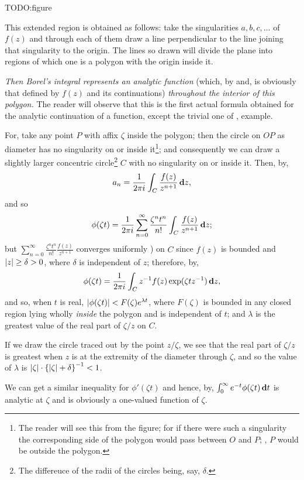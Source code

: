 TODO:figure

This extended region is obtained as follows: take the singularities
$a,b,c,\ldots$ of $f(z)$ and through each of them draw a line perpendicular
to the line joining that singularity to the origin. The lines so drawn
will divide the plane into regions of which one is a polygon with the
origin inside it.

\emph{Then Borel's integral represents an analytic function}
(which, by
and, is obviously that defined by $f(z)$
and its continuations)
\emph{throughout the interior of this polygon.} The reader will observe that
this is the first actual formula obtained for the analytic
continuation of a function, except the trivial one of
, example.

For, take any point $P$ with affix $\zeta$ inside the polygon; then
the circle on $OP$ as diameter has no singularity on or inside
it\footnote{The reader will see this from the figure; for if there were such a
singularity the corresponding side of the polygon would pass between
$O$ and $P$; \ie,
 $P$ would be outside the polygon.}; and
consequently we can draw a slightly
%
%
larger concentric circle\footnote{The differeuce of the radii of the
  circles being, say, $\delta$.} $C$ with no singularity on or inside
it. Then, by,
$$
a_{n}
=
\frac{1}{2 \pi i}
\int_{C} \frac{f(z)}{z^{n+1}} \, \mathbf{d} z,
$$
and so
$$
\phi(\zeta t)
=
\frac{1}{2 \pi i}
\sum_{n=0}^{\infty}
\frac{\zeta^{n} t^{n}}{n!}
\int_{C} \frac{f(z)}{z^{n+1}} \, \mathbf{d} z;
$$
but
$\sum_{n=0}^{\infty} \frac{\zeta^{n} t^{n}}{n!} \frac{f(z)}{z^{n+1}}$
converges uniformly ) on $C$ since
$f(z)$ is bounded and $\left| z \right| \geq \delta > 0$, where
$\delta$ is independent of $z$; therefore, by,
$$
\phi(\zeta t)
=
\frac{1}{2 \pi i}
\int_{C} z^{-1} f(z) \exp(\zeta t z^{-1}) \, \mathbf{d} z,
$$
and so, when $t$ is real,
$\left| \phi(\zeta t) \right| < F(\zeta) e^{\lambda t}$,
where $F(\zeta)$ is bounded in any closed region lying wholly
\emph{inside} the polygon and is independent of $t$;
and $\lambda$ is the greatest value of the real part of
$\zeta / z$ on $C$.

If we draw the circle traced out by the point $z/\zeta$, we see that
the real part of $\zeta/z$ is greatest when $z$ is at the extremity of the
diameter through $\zeta$, and so the value of $\lambda$ is
$ \left| \zeta \right| \cdot \left\{ \left| \zeta \right| + \delta \right\}^{-1} < 1$.

We can get a similar inequality for $\phi'(\zeta t)$ and hence,
by,
$\int_{0}^{\infty} e^{-t} \phi(\zeta t) \, \mathbf{d} t$
is analytic at $\zeta$ and is obviously a one-valued function of
$\zeta$.

